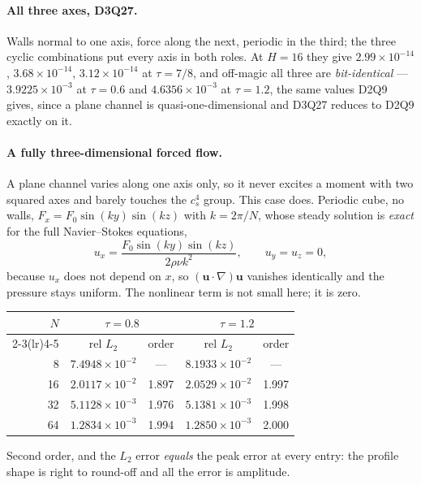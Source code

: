 \documentclass[11pt,a4paper]{article}
\newcommand{\cs}{c_s}
\newcommand{\uu}{\bm{u}}
\newcommand{\e}[1]{\times 10^{#1}}
\begin{document}
\paragraph{All three axes, D3Q27.} Walls normal to one axis, force along the
next, periodic in the third; the three cyclic combinations put every axis in
both roles. At $H=16$ they give $2.99\e{-14}$, $3.68\e{-14}$, $3.12\e{-14}$ at
$\tau=7/8$, and off-magic all three are \emph{bit-identical} ---
$3.9225\e{-3}$ at $\tau=0.6$ and $4.6356\e{-3}$ at $\tau=1.2$, the same values
D2Q9 gives, since a plane channel is quasi-one-dimensional and D3Q27 reduces to
D2Q9 exactly on it.

\paragraph{A fully three-dimensional forced flow.} A plane channel varies along
one axis only, so it never excites a moment with two squared axes and barely
touches the $\cs^4$ group. This case does. Periodic cube, no walls,
$F_x = F_0\sin(ky)\sin(kz)$ with $k=2\pi/N$, whose steady solution is
\emph{exact} for the full Navier--Stokes equations,
\begin{equation}
  u_x = \frac{F_0\sin(ky)\sin(kz)}{2\rho\nu k^2}, \qquad u_y=u_z=0,
\end{equation}
because $u_x$ does not depend on $x$, so $(\uu\!\cdot\!\nabla)\uu$ vanishes
identically and the pressure stays uniform. The nonlinear term is not small
here; it is zero.

\begin{center}\small
\begin{tabular}{rcccc}
\toprule
$N$ & \multicolumn{2}{c}{$\tau=0.8$} & \multicolumn{2}{c}{$\tau=1.2$} \\
\cmidrule(lr){2-3}\cmidrule(lr){4-5}
 & rel $L_2$ & order & rel $L_2$ & order \\
\midrule
8   & $7.4948\e{-2}$ & ---   & $8.1933\e{-2}$ & ---   \\
16  & $2.0117\e{-2}$ & 1.897 & $2.0529\e{-2}$ & 1.997 \\
32  & $5.1128\e{-3}$ & 1.976 & $5.1381\e{-3}$ & 1.998 \\
64  & $1.2834\e{-3}$ & 1.994 & $1.2850\e{-3}$ & 2.000 \\
\bottomrule
\end{tabular}
\end{center}

\noindent Second order, and the $L_2$ error \emph{equals} the peak error at
every entry: the profile shape is right to round-off and all the error is
amplitude.
\end{document}
